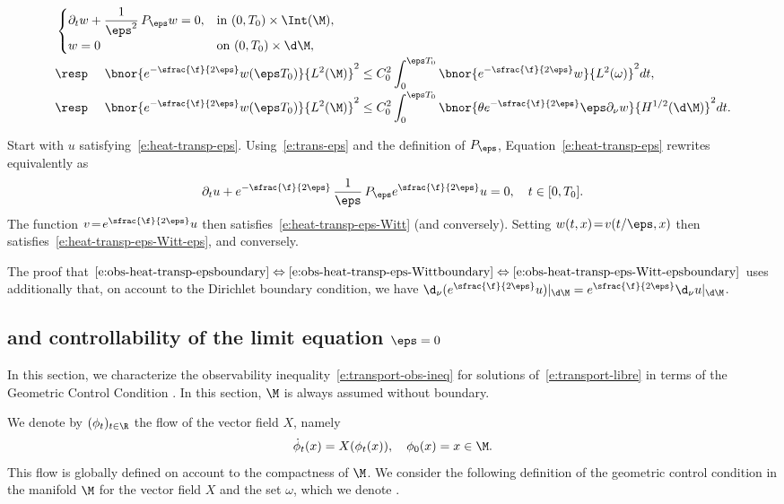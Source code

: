 \begin{lemma}
\begin{enumerate}
\begin{align}
\label{e:heat-transp-eps-Witt-eps}
&\begin{cases}
\partial_t w + \dfrac{1}{\eps^2}\,P_\eps w =0, & \text{in } (0,T_0)\times\Int(\M), \\
w = 0 & \text{on } (0,T_0)\times \d\M,
\end{cases}
\\[-2pt]
&\text{\resp }\quad \bnor{e^{-\sfrac{\f}{2\eps}}w(\eps T_0)}{L^2(\M)}^2 \leq C_0^2\int_0^{\eps T_0}\bnor{e^{-\sfrac{\f}{2\eps}}w}{L^2(\omega)}^2 dt,\nonumber \\[-2pt]
\label{e:obs-heat-transp-eps-Witt-epsboundary}
&\text{\resp } \quad \bnor{e^{-\sfrac{\f}{2\eps}}w(\eps T_0)}{L^2(\M)}^2 \leq C_0^2\int_0^{\eps T_0}\bnor{\theta e^{-\sfrac{\f}{2\eps}} \eps \partial_{\nu}w}{H^{1/2}(\d\M)}^2 dt.
\end{align}
\end{enumerate}
\end{lemma}
\bnp
Start \eg with $u$ satisfying~\eqref{e:heat-transp-eps}.
Using~\eqref{e:trans-eps} and the definition of $P_\eps$, Equation~\eqref{e:heat-transp-eps} rewrites equivalently as\vspace*{-3pt}
\[
\partial_t u + e^{-\sfrac{\f}{2\eps}}\, \frac{1}{\eps}\,P_\eps e^{\sfrac{\f}{2\eps}} u=0, \quad t \in [0,T_0].
\]
The function $v\!=\! e^{\sfrac{\f}{2\eps}} u$ then satisfies~\eqref{e:heat-transp-eps-Witt} (and conversely). Setting $w(t,x) \!=\! v(t/\eps, x)$ then satisfies~\eqref{e:heat-transp-eps-Witt-eps}, and conversely.

The proof that $\eqref{e:obs-heat-transp-epsboundary}\Leftrightarrow\eqref{e:obs-heat-transp-eps-Wittboundary}\Leftrightarrow\eqref{e:obs-heat-transp-eps-Witt-epsboundary}$ uses additionally that, on account to the Dirichlet boundary condition, we have $\d_\nu(e^{\sfrac{\f}{2\eps}} u) |_{\d\M} =e^{\sfrac{\f}{2\eps}} \d_\nu u |_{\d\M}$.
\enp

\subsection{\pGCC and controllability of the limit equation $\eps=0$}
\label{s:GCC}
In this section, we characterize the observability inequality~\eqref{e:transport-obs-ineq} for solutions of~\eqref{e:transport-libre} in terms of the Geometric Control Condition \pGCC. In this section, $\M$ is always assumed without boundary.

We denote by $(\phi_t)_{t\in \R}$ the flow of the vector field $X$, namely\vspace*{-3pt}
\begin{equation}
\label{e:def-flot}
\dot{\phi}_t(x) = X(\phi_t(x)),\quad \phi_0(x) = x \in \M.
\end{equation}
This flow is globally defined on account to the compactness of $\M$.
We consider the following definition of the geometric control condition in the manifold $\M$ for the vector field $X$ and the set $\omega$, which we denote \pGCC.

